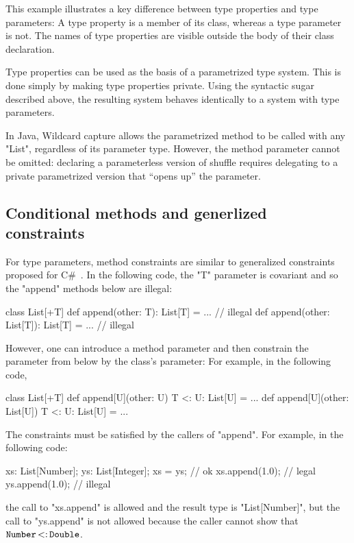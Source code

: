 \documentclass[preprint,nocopyrightspace,9pt]{sigplanconf}
\begin{document}
This example illustrates a key difference between type properties
and type parameters:
A type property is a member of its class, whereas a type parameter is
not.  The names of type properties are visible outside the body of
their class declaration.

Type properties can be used as the basis of a parametrized type
system.  This is done simply by making type properties private.
Using the syntactic sugar described above,
the resulting system behaves identically to a system with type
parameters.
\fi

In Java,
Wildcard
capture allows the parametrized method to be called with any \xcd"List",
regardless of its parameter type.
However,
the method parameter cannot be omitted: declaring a parameterless version
of shuffle requires delegating to a private parametrized version that
``opens up'' the parameter.

\subsection{Conditional methods and generlized constraints}

For type parameters, method constraints are 
similar to generalized constraints proposed for
C\#~\cite{emir06}.
%
In the following code, the \xcd"T" parameter is covariant
and so the \xcd"append" methods below are illegal:
\begin{xten}
class List[+T] {
  def append(other: T): List[T] = { ... }
      // illegal
  def append(other: List[T]): List[T] = { ... }
      // illegal
}
\end{xten}
%
However, one can introduce a method parameter and then constrain
the parameter from below by the class's parameter:
For example, in the following code,
\begin{xten}
class List[+T] {
  def append[U](other: U)
      {T <: U}: List[U] = { ... }
  def append[U](other: List[U])
      {T <: U}: List[U] = { ... }
}
\end{xten}

The constraints must be satisfied by the callers of \xcd"append".
For example, in the following code:
\begin{xten}
xs: List[Number];
ys: List[Integer];
xs = ys; // ok
xs.append(1.0); // legal
ys.append(1.0); // illegal
\end{xten}
the call to \xcd"xs.append" is allowed and the result type is \xcd"List[Number]", but
the call to \xcd"ys.append" is not allowed because the caller cannot show that
${\tt Number} \subtype {\tt Double}$.
\end{document}
